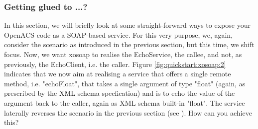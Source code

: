   \subsubsection{Getting glued to ...?}
  In this section, we will briefly look at some straight-forward ways to expose your OpenACS code as a 
SOAP-based service. For this very purpose, we, again, consider the scenario as introduced in the 
previous section, but this time, we shift focus. Now, we want xosoap to realise the EchoService, the 
callee, and not, as previously, the EchoClient, i.e. the caller. Figure \ref{fig:quickstart:xosoap:2} indicates 
that we now aim at realising a service that offers a single remote method, i.e. "echoFloat", that takes a 
single argument of type "float" (again, as prescribed by the XML schema specfication) and is to echo the 
value of the argument back to the caller, again as XML schema built-in "float". The service laterally 
reverses the scenario in the previous section (see ). How can you 
achieve this?

